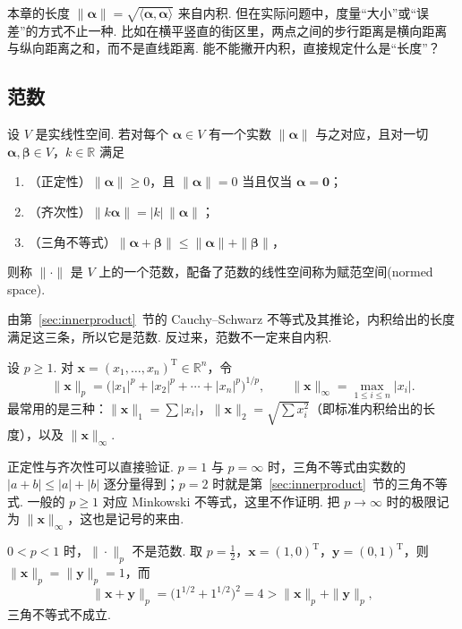 \documentclass[lang=cn,10.5pt,scheme=chinese,toc=twocol,section,chinesefont=nofont,
twoside,citestyle=gb7714-2015,bibstyle=gb7714-2015]{elegantbook}
\DeclareRobustCommand{\textbf}[1]{{\lnsemiboldlatin\lnsemiboldcjk #1}}
\newcommand{\vv}[1]{\boldsymbol{#1}}
\newcommand{\zero}{\boldsymbol{0}}          %
\newcommand{\trans}{\mathrm{T}}             %
\numberwithin{equation}{section}   %
\begin{document}
\begin{motivebox}
  本章的长度 $\|\vv\alpha\|=\sqrt{\langle\vv\alpha,\vv\alpha\rangle}$ 来自内积. 但在实际问题中，度量“大小”或“误差”的方式不止一种. 比如在横平竖直的街区里，两点之间的步行距离是横向距离与纵向距离之和，而不是直线距离. 能不能撇开内积，直接规定什么是“长度”？
\end{motivebox}

\subsection{范数}

\begin{definition}
  设 $V$ 是实线性空间. 若对每个 $\vv\alpha\in V$ 有一个实数 $\|\vv\alpha\|$ 与之对应，且对一切 $\vv\alpha,\vv\beta\in V$，$k\in\mathbb{R}$ 满足
  \begin{enumerate}
    \item （正定性）$\|\vv\alpha\|\ge0$，且 $\|\vv\alpha\|=0$ 当且仅当 $\vv\alpha=\zero$；
    \item （齐次性）$\|k\vv\alpha\|=|k|\,\|\vv\alpha\|$；
    \item （三角不等式）$\|\vv\alpha+\vv\beta\|\le\|\vv\alpha\|+\|\vv\beta\|$，
  \end{enumerate}
  则称 $\|\cdot\|$ 是 $V$ 上的一个\textbf{范数}，配备了范数的线性空间称为\textbf{赋范空间}(normed space).
\end{definition}

由第~\ref{sec:innerproduct}~节的 Cauchy–Schwarz 不等式及其推论，内积给出的长度满足这三条，所以它是范数. 反过来，范数不一定来自内积.

\begin{definition}
  设 $p\ge1$. 对 $\vv x=(x_1,\ldots,x_n)^\trans\in\mathbb{R}^n$，令
  \[
    \|\vv x\|_p=\big(|x_1|^p+|x_2|^p+\cdots+|x_n|^p\big)^{1/p},\qquad \|\vv x\|_\infty=\max_{1\le i\le n}|x_i|.
  \]
  最常用的是三种：$\|\vv x\|_1=\sum|x_i|$，$\|\vv x\|_2=\sqrt{\sum x_i^2}$（即标准内积给出的长度），以及 $\|\vv x\|_\infty$.
\end{definition}

正定性与齐次性可以直接验证. $p=1$ 与 $p=\infty$ 时，三角不等式由实数的 $|a+b|\le|a|+|b|$ 逐分量得到；$p=2$ 时就是第~\ref{sec:innerproduct}~节的三角不等式. 一般的 $p\ge1$ 对应 \textbf{Minkowski 不等式}，这里不作证明. 把 $p\to\infty$ 时的极限记为 $\|\vv x\|_\infty$，这也是记号的来由.

\begin{pitfallbox}
  $0<p<1$ 时，$\|\cdot\|_p$ \textbf{不是}范数. 取 $p=\frac12$，$\vv x=(1,0)^\trans$，$\vv y=(0,1)^\trans$，则 $\|\vv x\|_p=\|\vv y\|_p=1$，而
  \[\|\vv x+\vv y\|_p=\big(1^{1/2}+1^{1/2}\big)^2=4>\|\vv x\|_p+\|\vv y\|_p,\]
  三角不等式不成立.
\end{pitfallbox}
\end{document}
